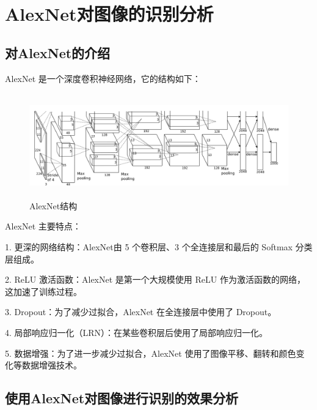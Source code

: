 \documentclass[UTF8]{ctexart}
\begin{document}
\section{AlexNet对图像的识别分析}
\subsection{对AlexNet的介绍}
AlexNet 是一个深度卷积神经网络，它的结构如下：\cite{AlexNet}

\begin{figure}[H]
    \centering %
    \includegraphics[height=4.5cm]{../AlexNet/AlexNet_arc.png}
    \caption{AlexNet结构}
\end{figure}

AlexNet 主要特点：\par
1. 更深的网络结构：AlexNet由 5 个卷积层、3 个全连接层和最后的 Softmax 分类层组成。 \par
2. ReLU 激活函数：AlexNet 是第一个大规模使用 ReLU 作为激活函数的网络，这加速了训练过程。 \par
3. Dropout：为了减少过拟合，AlexNet 在全连接层中使用了 Dropout。 \par
4. 局部响应归一化（LRN）：在某些卷积层后使用了局部响应归一化。 \par
5. 数据增强：为了进一步减少过拟合，AlexNet 使用了图像平移、翻转和颜色变化等数据增强技术。 \par

\subsection{使用AlexNet对图像进行识别的效果分析}
\end{document}
